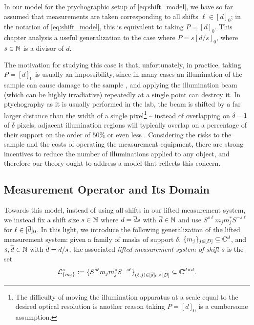 In our model for the ptychographic setup of \eqref{eq:shift_model}, we have so far assumed that measurements are taken corresponding to all shifts $\ell \in [d]_0$; in the notation of \eqref{eq:shift_model}, this is equivalent to taking $P = [d]_0$.  This chapter analysis a useful generalization to the case where $P = s[d / s]_0$, where $s \in \mathbb{N}$ is a divisor of $d$.  

The motivation for studying this case is that, unfortunately, in practice, taking $P = [d]_0$ is usually an impossibility, since in many cases an illumination of the sample can cause damage to the sample \cite{starodub2008damage}, and applying the illumination beam (which can be highly irradiative) repeatedly at a single point can destroy it.  In ptychography as it is usually performed in the lab, the beam is shifted by a far larger distance than the width of a single pixel\footnote{The difficulty of moving the illumination apparatus at a scale equal to the desired optical resolution is another reason taking $P = [d]_0$ is a cumbersome assumption.} -- instead of overlapping on $\delta - 1$ of $\delta$ pixels, adjacent illumination regions will typically overlap on a percentage of their support on the order of $50\%$ or even less \cite{marchesini2015coptych,shapiro2014nanometer}.  Considering the risks to the sample and the costs of operating the measurement equipment, there are strong incentives to reduce the number of illuminations applied to any object, and therefore our theory ought to address a model that reflects this concern.

\subsection{Measurement Operator and Its Domain}
\label{sec:pty_meas_op}
Towards this model, instead of using all shifts in our lifted measurement system, we instead fix a shift size $s \in \mathbb{N}$ where $d = \overline{d} s$ with $\overline{d} \in \mathbb{N}$ and use $S^{s \ell} m_j m_j^* S^{-s \ell}$ for $\ell \in [\overline{d}]_0$.  In this light, we introduce the following generalization of the lifted measurement system: given a family of masks of support $\delta$, $\{m_j\}_{j \in [D]} \subseteq \mathbb{C}^d$, and $s, \overline{d} \in \mathbb{N}$ with $\overline{d} = d / s$, the associated \emph{lifted measurement system of shift $s$} is the set \begin{equation} \mathcal{L}_{\{m_j\}}^s := \{S^{s \ell} m_j m_j^* S^{-s \ell}\}_{(\ell, j) \in [\overline{d}]_0 \times [D]} \subseteq \mathbb{C}^{d \times d}. \label{eq:lift_pty_sys}\end{equation}

